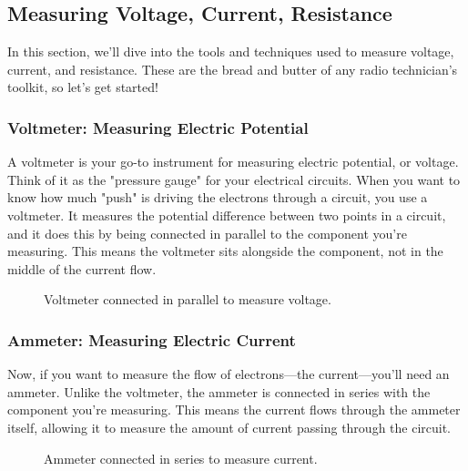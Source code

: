 \subsection{Measuring Voltage, Current, Resistance}
\label{subsec:voltage-current}

In this section, we'll dive into the tools and techniques used to measure voltage, current, and resistance. These are the bread and butter of any radio technician's toolkit, so let's get started!

\subsubsection*{Voltmeter: Measuring Electric Potential}

A voltmeter is your go-to instrument for measuring electric potential, or voltage. Think of it as the "pressure gauge" for your electrical circuits. When you want to know how much "push" is driving the electrons through a circuit, you use a voltmeter. It measures the potential difference between two points in a circuit, and it does this by being connected in parallel to the component you're measuring. This means the voltmeter sits alongside the component, not in the middle of the current flow.

\begin{figure}[h]
    \centering
    \caption{Voltmeter connected in parallel to measure voltage.}
    \label{fig:voltmeter-parallel}
\end{figure}

\subsubsection*{Ammeter: Measuring Electric Current}

Now, if you want to measure the flow of electrons—the current—you'll need an ammeter. Unlike the voltmeter, the ammeter is connected in series with the component you're measuring. This means the current flows through the ammeter itself, allowing it to measure the amount of current passing through the circuit.

\begin{figure}[h]
    \centering
    \caption{Ammeter connected in series to measure current.}
    \label{fig:ammeter-series}
\end{figure}


